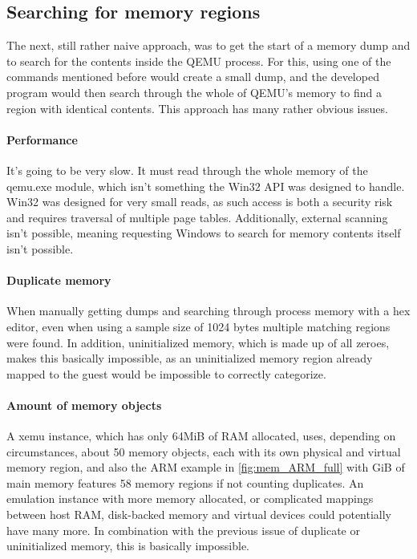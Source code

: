 \subsection{Searching for memory regions}
The next, still rather naive approach,
was to get the start of a memory dump and to search for the contents inside the QEMU process.
For this, using one of the commands mentioned before would create a small dump,
and the developed program would then search through the whole of QEMU's memory
to find a region with identical contents.
This approach has many rather obvious issues.

\paragraph{Performance} It's going to be very slow.
It must read through the whole memory of the qemu.exe module,
which isn't something the Win32 API was designed to handle.
Win32 was designed for very small reads, as such access is both a security risk
and requires traversal of multiple page tables.
Additionally, external scanning isn't possible,
meaning requesting Windows to search for memory contents itself isn't possible.

\paragraph{Duplicate memory}
When manually getting dumps and searching through process memory with a hex editor,
even when using a sample size of 1024 bytes multiple matching regions were found.
In addition, uninitialized memory, which is made up of all zeroes,
makes this basically impossible,
as an uninitialized memory region already mapped to the guest would be impossible to correctly categorize.

\paragraph{Amount of memory objects}
A xemu\cite{xemu} instance, which has only 64MiB of RAM allocated, uses, depending on circumstances,
about 50 memory objects, each with its own physical and virtual memory region,
and also the ARM example in \autoref{fig:mem_ARM_full} with GiB of main memory features 58 memory regions if not counting duplicates.
An emulation instance with more memory allocated,
or complicated mappings between host RAM, disk-backed memory and virtual devices could potentially have many more.
In combination with the previous issue of duplicate or uninitialized memory, this is basically impossible.

